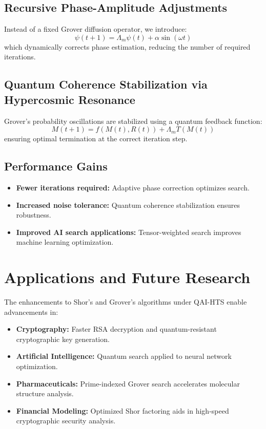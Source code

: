 \documentclass[12pt]{article}
\begin{document}
\subsection{Recursive Phase-Amplitude Adjustments}
Instead of a fixed Grover diffusion operator, we introduce:
\begin{equation}
    \psi(t+1) = \Lambda_m \psi(t) + \alpha \sin(\omega t)
\end{equation}
which dynamically corrects phase estimation, reducing the number of required iterations.

\subsection{Quantum Coherence Stabilization via Hypercosmic Resonance}
Grover’s probability oscillations are stabilized using a quantum feedback function:
\begin{equation}
    M(t+1) = f(M(t), R(t)) + \Lambda_m T(M(t))
\end{equation}
ensuring optimal termination at the correct iteration step.

\subsection{Performance Gains}
\begin{itemize}
    \item \textbf{Fewer iterations required:} Adaptive phase correction optimizes search.
    \item \textbf{Increased noise tolerance:} Quantum coherence stabilization ensures robustness.
    \item \textbf{Improved AI search applications:} Tensor-weighted search improves machine learning optimization.
\end{itemize}

\section{Applications and Future Research}
The enhancements to Shor’s and Grover’s algorithms under QAI-HTS enable advancements in:
\begin{itemize}
    \item \textbf{Cryptography:} Faster RSA decryption and quantum-resistant cryptographic key generation.
    \item \textbf{Artificial Intelligence:} Quantum search applied to neural network optimization.
    \item \textbf{Pharmaceuticals:} Prime-indexed Grover search accelerates molecular structure analysis.
    \item \textbf{Financial Modeling:} Optimized Shor factoring aids in high-speed cryptographic security analysis.
\end{itemize}
\end{document}
